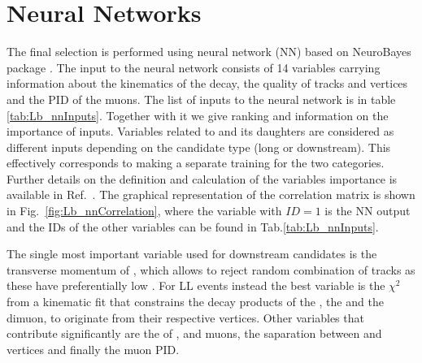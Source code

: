 \section{Neural Networks}
\label{sec:Lb_mva}

The final selection is performed using neural network (NN) based on NeuroBayes package \cite{Feindt:2006pm,feindt-2004}.
The input to the neural network consists of 14 variables carrying information about the kinematics of the decay,
the quality of tracks and vertices and the PID of the muons.
The list of inputs to the neural network is in table \ref{tab:Lb_nnInputs}. Together with it we give
ranking and information on the importance of inputs.
%
%
%
Variables related to \Lz and its daughters are considered as different inputs depending on the
candidate type (long or downstream). This effectively corresponds to making a separate
training for the two categories. Further details on the definition and calculation of the
variables importance is available in Ref.~\cite{LHCb-ANA-2011-094}.
The graphical representation of the correlation matrix is shown in Fig.~\ref{fig:Lb_nnCorrelation},
where the variable with $ID = 1$ is the NN output and the IDs of the other variables can be found
in Tab.\ref{tab:Lb_nnInputs}.

The single most important variable used for downstream candidates is the transverse momentum of
\Lz, which allows to reject random combination of tracks as these have preferentially low \pt.
For LL events instead the best variable is the $\chi^2$ from a kinematic fit that constrains
the decay products of the \Lb, the \Lz and the dimuon, to originate from their respective vertices.
Other variables that contribute significantly are the \chisqip of \Lb, \Lz and muons,
the saparation between \Lb and \Lz vertices and finally the muon PID.

